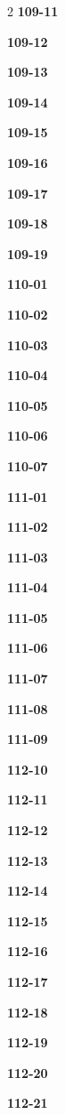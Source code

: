 \documentclass[10pt,a4paper]{article}
\begin{document}
\begin{multicols}{2}
\noindent\textbf{109-11}\ \par
\noindent\textbf{109-12}\ \par
\noindent\textbf{109-13}\ \par
\noindent\textbf{109-14}\ \par
\noindent\textbf{109-15}\ \par
\noindent\textbf{109-16}\ \par
\noindent\textbf{109-17}\ \par
\noindent\textbf{109-18}\ \par
\noindent\textbf{109-19}\ \par
\noindent\textbf{110-01}\ \par
\noindent\textbf{110-02}\ \par
\noindent\textbf{110-03}\ \par
\noindent\textbf{110-04}\ \par
\noindent\textbf{110-05}\ \par
\noindent\textbf{110-06}\ \par
\noindent\textbf{110-07}\ \par
\noindent\textbf{111-01}\ \par
\noindent\textbf{111-02}\ \par
\noindent\textbf{111-03}\ \par
\noindent\textbf{111-04}\ \par
\noindent\textbf{111-05}\ \par
\noindent\textbf{111-06}\ \par
\noindent\textbf{111-07}\ \par
\noindent\textbf{111-08}\ \par
\noindent\textbf{111-09}\ \par
\noindent\textbf{112-10}\ \par
\noindent\textbf{112-11}\ \par
\noindent\textbf{112-12}\ \par
\noindent\textbf{112-13}\ \par
\noindent\textbf{112-14}\ \par
\noindent\textbf{112-15}\ \par
\noindent\textbf{112-16}\ \par
\noindent\textbf{112-17}\ \par
\noindent\textbf{112-18}\ \par
\noindent\textbf{112-19}\ \par
\noindent\textbf{112-20}\ \par
\noindent\textbf{112-21}\ \par

\end{multicols}
\end{document}
